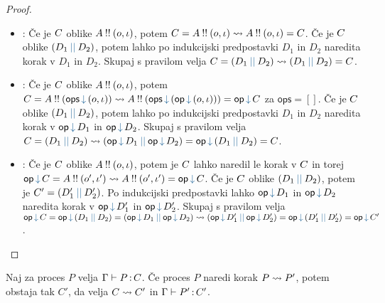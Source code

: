 \begin{proof}
	\begin{itemize}
		\item {} : Če je $C$ oblike $A \mathbin{!!} (o,\iota)$, potem $C = A \mathbin{!!} (o,\iota) \rightsquigarrow A \mathbin{!!} (o,\iota) = C$.
		Če je $C$ oblike $\typar{D_1}{D_2}$, potem lahko po indukcijski predpostavki $D_1$ in $D_2$ naredita korak v $D_1$ in $D_2$. Skupaj s pravilom  velja $C = \typar{D_1}{D_2} \reduces \typar{D_1}{D_2} = C$.
		
		\item {} : Če je $C$ oblike $A \mathbin{!!} (o,\iota)$, potem $\tyC = \tyrun{A}{\opincomp{ops}{(\o, \i)}} \tyreduces \tyrun{A}{\opincomp{ops}{(\opincomp{op}{(\o, \i)})}} = \opincomp{op}{\tyC}$ za $\mathsf{ops} = []$.
		Če je $C$ oblike $\typar{D_1}{D_2}$, potem lahko po indukcijski predpostavki $D_1$ in $D_2$ naredita korak v $\opincomp{op}{D_1}$ in $\opincomp{op}{D_2}$. Skupaj s pravilom  velja $C = \typar{D_1}{D_2} \reduces \typar{\opincomp{op}{D_1}}{\opincomp{op}{D_2}} = \opincomp{op}{\typar{D_1}{D_2}} = C$.
		
		\item {} : Če je $C$ oblike $A \mathbin{!!} (o,\iota)$, potem je $C$ lahko naredil le korak v $C$ in torej $\opincomp{op}{\tyC} = \tyrun{A}{\o',\i'} \tyreduces \tyrun{A}{\o',\i'} = \opincomp{op}{\tyC}$.
		Če je $C$ oblike $\typar{D_1}{D_2}$, potem je $\tyC' = \typar{D_1'}{D_2'}$.
		Po indukcijski predpostavki lahko $\opincomp{op}{\tyD_1}$ in $\opincomp{op}{\tyD_2}$ naredita korak v $\opincomp{op}{\tyD_1'}$ in $\opincomp{op}{\tyD_2'}$.
		Skupaj s pravilom  velja $\opincomp{op}{\tyC} = \opincomp{op}{\typar{D_1}{D_2}} = \typar{\opincomp{op}{\tyD_1}}{\opincomp{op}{\tyD_2}} \reduces \typar{\opincomp{op}{\tyD_1'}}{\opincomp{op}{\tyD_2'}} = \opincomp{op}{\typar{D_1'}{D_2'}} = \opincomp{op}{\tyC'}$.
	\end{itemize}
\end{proof}


\begin{izrek}[o ohranitvi]\label{izr:ohranitev}
	Naj za proces $P$ velja $\Gamma \vdash P \mathinner{:} C$. Če proces $P$ naredi korak $P \leadsto P'$, potem obstaja tak $C'$, da velja $C \rightsquigarrow C'$ in $\Gamma \vdash P' \mathinner{:} C'$.
\end{izrek}

